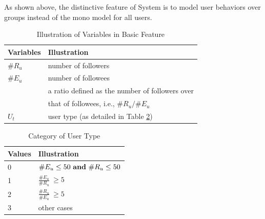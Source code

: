 As shown above, the distinctive feature of System  \sys{} is to model user \retg{} behaviors over groups instead of the mono model for all users.

\begin{table}[tb!]
\centering
\begin{small}
\caption{Illustration of Variables in Basic Feature}
\label{tbl:fe-info}
\begin{tabular}{ll}
\toprule
\multicolumn{1}{l}{\textbf{Variables}} & \multicolumn{1}{l}{\textbf{Illustration}}	\\	\midrule \midrule
\#$R_u$				& number of followers				\\	\midrule
\#$E_u$				& number of followees				\\	\midrule
                    & a ratio defined as the number of followers over \\
\raisebox{1.5ex}{$R_{ee}$}  & that of followees, i.e., ${\#R_u}/{\#E_u}$ \\  \midrule
$U_t$					& user type (as detailed in Table \ref{tbl:ucate})			\\ \bottomrule
\end{tabular}
\end{small}
\vspace{-3ex}
\end{table}
\begin{table}[tb!]
\centering
\begin{small}
\caption{Category of User Type}
\label{tbl:ucate}
\begin{tabular}{ll}
\toprule
\multicolumn{1}{l}{\textbf{Values}} & \multicolumn{1}{l}{\textbf{Illustration}}	\\	\midrule \midrule
0                       & $\#E_u \le 50 \ {\bf and} \ \#R_u \le 50$				\\	\midrule
\multirow{2}{*}{1}      & \multirow{2}{*}{$\frac{\#E_u}{\#R_u} \ \ge 5$}	\\
 						&                       									\\	\midrule
\multirow{2}{*}{2}		& \multirow{2}{*}{$\frac{\#R_u}{\#E_u} \ \ge 5$}  \\
						&															\\	\midrule
3                   	& other cases 												\\ \bottomrule
\end{tabular}
\end{small}
\vspace{-2ex}
\end{table}


